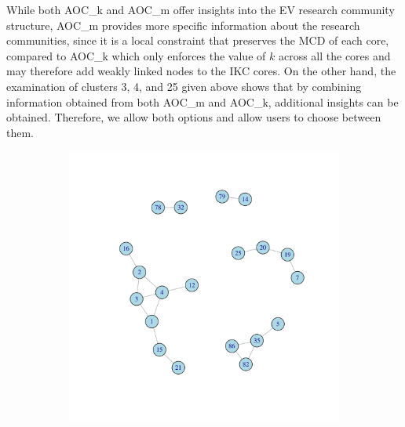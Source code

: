 \documentclass[12pt, oneside]{article}   	%
\begin{document}
{While both AOC\_k and AOC\_m offer insights into the EV research community structure,   AOC\_m provides more specific information about the research communities, since it is a local constraint that preserves the MCD of each core, compared to AOC\_k which only enforces the value of $k$ across all the cores and may therefore add weakly linked nodes to the IKC cores. 
On the other hand, the examination of clusters 3, 4, and 25 given above shows that by combining information obtained from both AOC\_m and AOC\_k, additional insights can be obtained.  
Therefore, we allow both options and allow users to choose between them.

\begin{figure}[H]
\centering
\begin{subfigure}[t]{0.48\textwidth}
\centering
\includegraphics[width=\linewidth]{ikc10_m_pw.pdf} 
\end{subfigure}
\hfill
\begin{subfigure}[t]{0.48\textwidth}
\centering

\end{subfigure}
\end{figure}}
\end{document}
